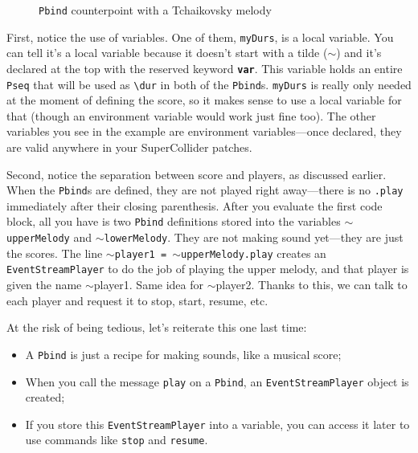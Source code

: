 \begin{figure}[h]
\centerline{}
\caption{\texttt{Pbind} counterpoint with a Tchaikovsky melody}
\label{fig:counterpoint}
\end{figure}

First, notice the use of variables. One of them, \texttt{myDurs}, is a local variable. You can tell it's a local variable because it doesn't start with a tilde ($\sim$) and it's declared at the top with the reserved keyword \texttt{\textbf{var}}. This variable holds an entire \texttt{Pseq} that will be used as \texttt{\textbackslash dur} in both of the \texttt{Pbind}s. \texttt{myDurs} is really only needed at the moment of defining the score, so it makes sense to use a local variable for that (though an environment variable would work just fine too). The other variables you see in the example are environment variables---once declared, they are valid anywhere in your SuperCollider patches.

Second, notice the separation between score and players, as discussed earlier. When the \texttt{Pbind}s are defined, they are not played right away---there is no \texttt{.play} immediately after their closing parenthesis. After you evaluate the first code block, all you have is two \texttt{Pbind} definitions stored into the variables \texttt{$\sim$upperMelody} and \texttt{$\sim$lowerMelody}. They are not making sound yet---they are just the scores. The line \texttt{$\sim$player1 = $\sim$upperMelody.play} creates an \texttt{EventStreamPlayer} to do the job of playing the upper melody, and that player is given the name $\sim$player1. Same idea for $\sim$player2. Thanks to this, we can talk to each player and request it to stop, start, resume, etc.

At the risk of being tedious, let's reiterate this one last time:
\begin{itemize}
\item A \texttt{Pbind} is just a recipe for making sounds, like a musical score;
\item When you call the message \texttt{play} on a \texttt{Pbind}, an \texttt{EventStreamPlayer} object is created;
\item If you store this \texttt{EventStreamPlayer} into a variable, you can access it later to use commands like \texttt{stop} and \texttt{resume}.
\end{itemize} 
